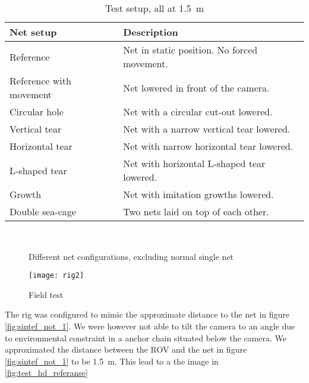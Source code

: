 \begin{table}[htbp]
	\centering
	\begin{tabular}{ll}
		\toprule
			Net setup 					& Description  \\
		\midrule
			Reference					& Net in static position. No forced movement. \\
			Reference with movement		& Net lowered in front of the camera. \\
			Circular hole				& Net with a circular cut-out lowered. \\
			Vertical tear				& Net with a narrow vertical tear lowered. \\
			Horizontal tear				& Net with narrow horizontal tear lowered. \\
			L-shaped tear				& Net with horizontal L-shaped tear lowered. \\
			Growth						& Net with imitation growths lowered.\\
			Double sea-cage				& Two nets laid on top of each other.\\
		\bottomrule
	\end{tabular}
	\caption{Test setup, all at \SI{1.5}{\metre}}
	\label{tbl:test_setup}
\end{table}

\begin{figure}[htbp]
    \centering
     \hfill
     \hfill
    \\
	 \hfill
	\caption{Different net configurations, excluding normal single net}
	\label{fig:net_configs}
\end{figure}

\begin{figure}[htbp]
	\centering
	\texttt{[image: rig2]}
	\caption{Field test}
	\label{fig:test_hd}
\end{figure}

The rig was configured to mimic the approximate distance to the net 
in figure \vref{fig:sintef_not_1}. We were however not able to tilt the camera to 
an angle due to environmental constraint in a anchor chain situated below the camera.
We approximated the distance between the ROV and the net in figure \vref{fig:sintef_not_1} to be 
\SI{1.5}{\metre}. This lead to a the image in \vref{fig:test_hd_referanse}


